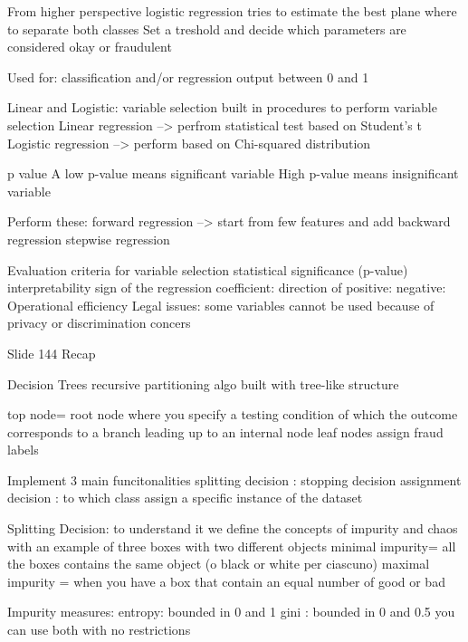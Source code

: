         From higher perspective logistic regression tries to estimate the best plane where to separate both classes 
        Set a treshold and decide which parameters are considered okay or fraudulent 

        Used for:
            classification and/or regression 
            output between 0 and 1 

    Linear and Logistic: variable selection 
        built in procedures to perform variable selection 
        Linear regression --> perfrom statistical test based on Student's t 
        Logistic regression --> perform based on Chi-squared distribution 

        p value 
        A low p-value means significant variable 
        High p-value means insignificant variable 

        Perform these:
            forward regression --> start from few features and add 
            backward regression 
            stepwise regression 

        Evaluation criteria for variable selection 
            statistical significance (p-value)
            interpretability
                sign of the regression coefficient: direction of 
                    positive: 
                    negative: 
            Operational efficiency 
            Legal issues: some variables cannot be used because of privacy or discrimination concers 

    Slide 144 Recap

    Decision Trees
        recursive partitioning algo built with tree-like structure 

        top node= root node where you specify a testing condition of which the outcome corresponds to a branch leading up to an internal node 
        leaf nodes assign fraud labels 

        Implement 3 main funcitonalities 
            splitting decision : 
            stopping decision 
            assignment decision : to which class assign a specific instance of the dataset 

            Splitting Decision:
                to understand it we define the concepts of impurity and chaos
                with an example of three boxes with two different objects 
                minimal impurity= all the boxes contains the same object (o black or white per ciascuno)
                maximal impurity = when you have a box that contain an equal number of good or bad 

                Impurity measures:
                    entropy: bounded in 0 and 1
                    gini : bounded in 0 and 0.5
                    you can use both with no restrictions 

